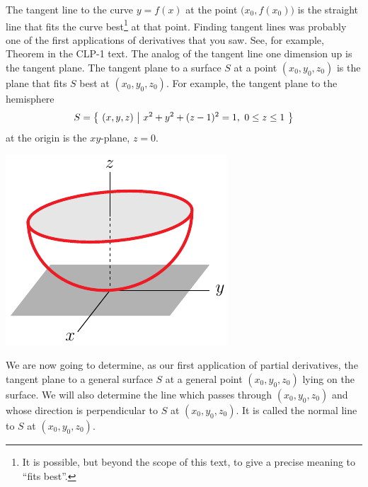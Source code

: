 The tangent line to the curve $y=f(x)$ at the point $\big(x_0,f(x_0)\big)$ 
is the straight line that fits the curve best\footnote{It is possible,
but beyond the scope of this text, to give a precise meaning to
``fits best''.} 
at that point.
Finding tangent lines was probably one of the first applications 
of derivatives that you saw. See, for example, 
Theorem  in the CLP-1 text.
The analog of the tangent line one dimension up is the tangent plane.
The tangent plane to a surface $S$ at a point  $(x_0,y_0,z_0)$ is the plane
that fits $S$ best at $(x_0,y_0,z_0)$. For example, the tangent plane
to the hemisphere 
\begin{equation*}
S=\big\{ \ (x,y,z)\ \big|\ x^2+y^2+(z-1)^2=1,\ 0\le z\le 1\ \big\}
\end{equation*} 
at the origin is the $xy$-plane, $z=0$.
\begin{efig}
\begin{center}
   \includegraphics{sphereTanPlane.pdf}
\end{center}
\end{efig}


We are now going to determine, as our first application of partial derivatives,
the tangent plane to a general surface $S$ at a general point $(x_0,y_0,z_0)$
lying on the surface.
We will also determine the line which passes through $(x_0,y_0,z_0)$ 
and whose direction is perpendicular to $S$ at $(x_0,y_0,z_0)$. It is called
the normal line to $S$ at $(x_0,y_0,z_0)$. 

